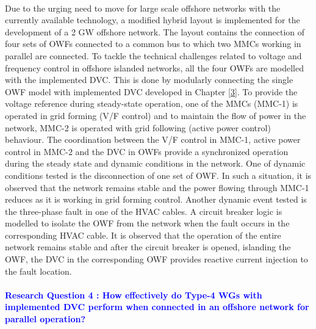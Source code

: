 \paragraph{} Due to the urging need to move for large scale offshore networks with the currently available technology, a modified hybrid layout is implemented for the development of a 2 GW offshore network. The layout contains the connection of four sets of \gls{OWF}s connected to a common bus to which two \gls{MMC}s working in parallel are connected. To tackle the technical challenges related to voltage and frequency control in offshore islanded networks, all the four \gls{OWF}s are modelled with the implemented \gls{DVC}. This is done by modularly connecting the single \gls{OWF} model with implemented \gls{DVC} developed in Chapter \ref{3}. To provide the voltage reference during steady-state operation, one of the \gls{MMC}s (\gls{MMC}-1) is operated in grid forming (V/F control) and to maintain the flow of power in the network, \gls{MMC}-2 is operated with grid following (active power control) behaviour. %
The coordination between the V/F control in \gls{MMC}-1, active power control in \gls{MMC}-2 and the \gls{DVC} in \gls{OWF}s provide a synchronized operation during the steady state and dynamic conditions in the network. One of dynamic conditions tested is the disconnection of one set of \gls{OWF}. In such a situation, it is observed that the network remains stable and the power flowing through \gls{MMC}-1 reduces as it is working in grid forming control. Another dynamic event tested is the three-phase fault in one of the \gls{HVAC} cables. A circuit breaker logic is modelled to isolate the \gls{OWF} from the network when the fault occurs in the corresponding \gls{HVAC} cable. It is observed that the operation of the entire network remains stable and after the circuit breaker is opened, islanding the \gls{OWF}, the \gls{DVC} in the corresponding \gls{OWF} provides reactive current injection to the fault location.

\paragraph{\textcolor{blue}{Research Question 4 : How effectively do Type-4 \gls{WG}s with implemented \gls{DVC} perform when connected in an offshore network for parallel operation?}}

